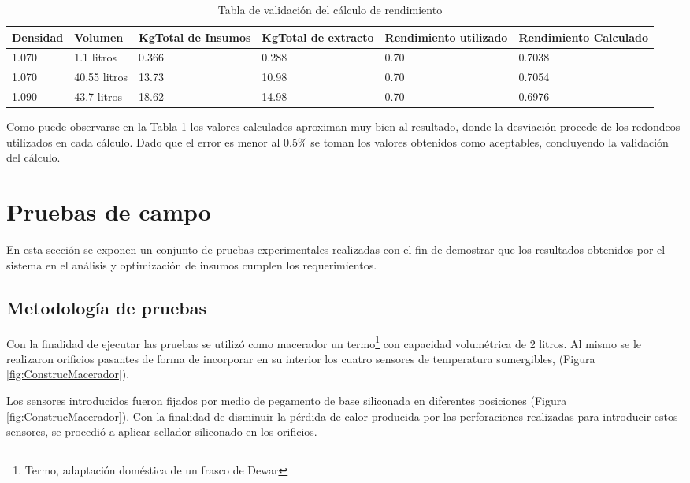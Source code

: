 \begin{table}[h]
    \centering
    \begin{tabularx}{\textwidth}{|X|X|X|X|X|X|}
        \hline
        Densidad & Volumen & KgTotal de Insumos & KgTotal de extracto & Rendimiento utilizado & Rendimiento Calculado \\
        \hline
        \hline
        1.070 & 1.1 litros & 0.366 & 0.288 & 0.70 & 0.7038\\ \hline
        1.070 & 40.55 litros & 13.73 & 10.98 & 0.70 & 0.7054 \\ \hline
        1.090 & 43.7 litros & 18.62 & 14.98 & 0.70 & 0.6976 \\ \hline
    \end{tabularx}
    \caption{Tabla de validación del cálculo de rendimiento  }
    \label{tab:rendimiento}
\end{table}

\par Como puede observarse en la Tabla \ref{tab:rendimiento} los valores calculados aproximan muy bien al resultado, donde la desviación procede de los redondeos utilizados en cada cálculo. Dado que el error es menor al 0.5\% se toman los valores obtenidos como aceptables, concluyendo la validación del cálculo.


\section{Pruebas de campo}
\par En esta sección se exponen un conjunto de pruebas experimentales realizadas con el fin de demostrar que los resultados obtenidos por el sistema en el análisis y optimización de insumos cumplen los requerimientos. 

    \subsection{Metodología de pruebas}
        \par Con la finalidad de ejecutar las pruebas se utilizó como macerador un termo\footnote{Termo, adaptación doméstica de un frasco de Dewar} con capacidad volumétrica de 2 litros. Al mismo se le realizaron orificios pasantes de forma de incorporar en su interior los cuatro sensores de temperatura sumergibles, (Figura \ref{fig:ConstrucMacerador}).
        
        \par Los sensores introducidos fueron fijados por medio de pegamento de base siliconada en diferentes posiciones (Figura \ref{fig:ConstrucMacerador}). Con la finalidad de disminuir la pérdida de calor producida por las perforaciones realizadas para introducir estos sensores, se procedió a aplicar sellador siliconado  en los orificios.
        

